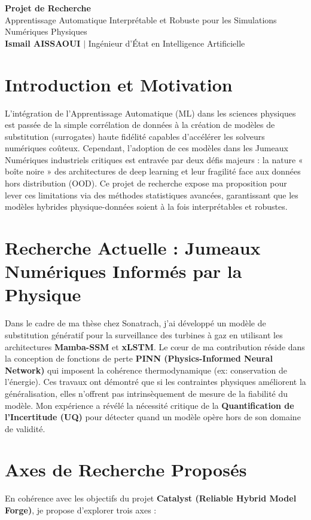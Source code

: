 \documentclass[11pt,a4paper]{article}
\begin{document}
\begin{center}
    {\LARGE\bfseries\color{titleblue} Projet de Recherche}\\[6pt]
    {\large Apprentissage Automatique Interprétable et Robuste pour les Simulations Numériques Physiques}\\[4pt]
    \textbf{Ismail AISSAOUI} $|$ Ingénieur d'État en Intelligence Artificielle
\end{center}

\bigskip

\section{Introduction et Motivation}
L'intégration de l'Apprentissage Automatique (ML) dans les sciences physiques est passée de la simple corrélation de données à la création de modèles de substitution (surrogates) haute fidélité capables d'accélérer les solveurs numériques coûteux. Cependant, l'adoption de ces modèles dans les Jumeaux Numériques industriels critiques est entravée par deux défis majeurs : la nature « boîte noire » des architectures de deep learning et leur fragilité face aux données hors distribution (OOD). Ce projet de recherche expose ma proposition pour lever ces limitations via des méthodes statistiques avancées, garantissant que les modèles hybrides physique-données soient à la fois interprétables et robustes.

\section{Recherche Actuelle : Jumeaux Numériques Informés par la Physique}
Dans le cadre de ma thèse chez Sonatrach, j'ai développé un modèle de substitution génératif pour la surveillance des turbines à gaz en utilisant les architectures \textbf{Mamba-SSM} et \textbf{xLSTM}. Le cœur de ma contribution réside dans la conception de fonctions de perte \textbf{PINN (Physics-Informed Neural Network)} qui imposent la cohérence thermodynamique (ex: conservation de l'énergie). Ces travaux ont démontré que si les contraintes physiques améliorent la généralisation, elles n'offrent pas intrinsèquement de mesure de la fiabilité du modèle. Mon expérience a révélé la nécessité critique de la \textbf{Quantification de l'Incertitude (UQ)} pour détecter quand un modèle opère hors de son domaine de validité.

\section{Axes de Recherche Proposés}
En cohérence avec les objectifs du projet \textbf{Catalyst (Reliable Hybrid Model Forge)}, je propose d'explorer trois axes :
\end{document}
